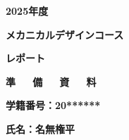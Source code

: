 \thispagestyle{empty}
\vspace{5em}
{\Large


\vspace{5em}

\begin{center}
\vspace*{25.4truemm}
\centerline{\LARGE \bf 2025年度}
\vskip 2pc
\centerline{\Huge \bf メカニカルデザインコース}
\vskip 2pc
\centerline{\Huge \bf レポート}
\vskip 3pc
\centerline{\LARGE \bf 準\ \ \ 備\ \ \ 資\ \ \ 料}
\vskip 3pc
\centerline{\Large \bf 学籍番号：20******}
\vskip 3pc
\centerline{\Large \bf 氏名：名無権平}
\vskip 10pc

\vspace{1em}
\end{center}
}
\vspace{2em}


\clearpage